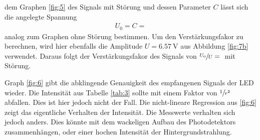 \justifying dem Graphen \ref{fig:5} des Signals mit Störung und dessen Parameter $C$ lässt sich die angelegte Spannung 
\begin{align}
    U_0 = C = \text{}
\end{align}
analog zum Graphen ohne Störung bestimmen. Um den Verstärkungsfakor zu berechnen, wird hier ebenfalls die Amplitude $U = \SI{6.57}{\volt}$ aus 
Abbildung \ref{fig:7b} verwendet. Daraus folgt der Verstärkungsfakor des Signals von $\sfrac{U_0}{U} = \text{}$ mit Störung.

\justifying Graph \ref{fig:6} gibt die abklingende Genauigkeit des empfangenen Signals der LED wieder. Die Intensität aus Tabelle
\ref{tab:3} sollte mit einem Faktor von $\sfrac{1}{r^2}$ abfallen. Dies ist hier jedoch nicht der Fall. Die nicht-lineare Regression aus \ref{fig:6} 
zeigt das eigentliche Verhalten der Intensität. Die Messwerte verhalten sich jedoch anders. Dies könnte mit dem wackeligen Aufbau des Photodetektors
zusammenhängen, oder einer hochen Intensität der Hintergrundstrahlung.

\newpage
\printbibliography

